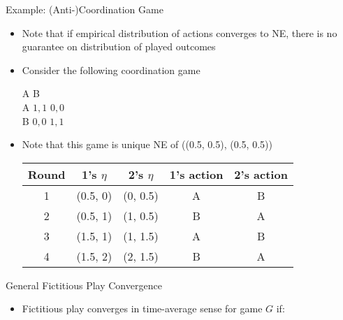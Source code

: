 \documentclass[11pt,aspectratio=169]{beamer}
\begin{document}
  
  \begin{frame}{Example: (Anti-)Coordination Game}
   \begin{itemize}[<+->]
    \item Note that if empirical distribution of actions converges to NE, there is no guarantee on distribution of played outcomes
    \item Consider the following coordination game
    \begin{center}\scriptsize
     \hspace{-3.5em}
     \begin{game}{2}{2}
      	\> A		\> B		\\
      A	\> $1,1$	\> $0,0$	\\
      B	\> $0,0$	\> $1,1$
     \end{game}
    \end{center}
    \vspace{1em}
    \item Note that this game is unique NE of ((0.5, 0.5), (0.5, 0.5))
    \vspace{1em}
    \begin{center}
     \begin{tabular}{ccccc}
      Round	& 1's $\eta$	& 2's $\eta$	& 1's action	& 2's action			\\ \hline
      1		& (0.5, 0)	& (0, 0.5) 	& A			& B			\pause	\\
      2		& (0.5, 1)	& (1, 0.5) 	& B			& A			\pause	\\
      3		& (1.5, 1)	& (1, 1.5) 	& A			& B			\pause	\\
      4		& (1.5, 2)	& (2, 1.5) 	& B			& A					\\
     \end{tabular}
    \end{center}
   \end{itemize}
  \end{frame}  
  
  
  \begin{frame}{General Fictitious Play Convergence}
   \begin{itemize}[<+->]
   \setlength{\itemsep}{1.2em}
    \item Fictitious play converges in time-average sense for game $G$ if:
   \end{itemize}
  \end{frame}
  
\end{document}
